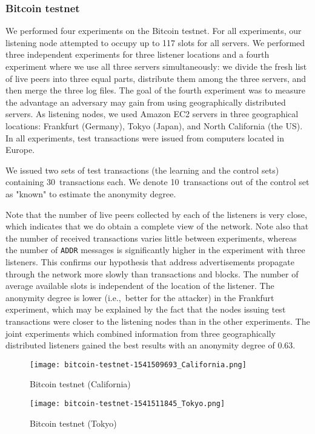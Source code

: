 \subsubsection{Bitcoin testnet}

We performed four experiments on the Bitcoin testnet.
For all experiments, our listening node attempted to occupy up to 117 slots for all servers.
We performed three independent experiments for three listener locations and a fourth experiment where we use all three servers simultaneously: we divide the fresh list of live peers into three equal parts, distribute them among the three servers, and then merge the three log files.
The goal of the fourth experiment was to measure the advantage an adversary may gain from using geographically distributed servers.
As listening nodes, we used Amazon EC2 servers in three geographical locations: Frankfurt (Germany), Tokyo (Japan), and North California (the US).
In all experiments, test transactions were issued from computers located in Europe.

We issued two sets of test transactions (the learning and the control sets) containing 30~transactions each.
We denote 10~transactions out of the control set as "known" to estimate the anonymity degree.

Note that the number of live peers collected by each of the listeners is very close, which indicates that we do obtain a complete view of the network.
Note also that the number of received transactions varies little between experiments, whereas the number of \texttt{ADDR} messages is significantly higher in the experiment with three listeners.
This confirms our hypothesis that address advertisements propagate through the network more slowly than transactions and blocks.
The number of average available slots is independent of the location of the listener.
The anonymity degree is lower (i.e.,~better for the attacker) in the Frankfurt experiment, which may be explained by the fact that the nodes issuing test transactions were closer to the listening nodes than in the other experiments.
The joint experiments which combined information from three geographically distributed listeners gained the best results with an anonymity degree of 0.63.

\begin{figure*}
	\centering
	\begin{minipage}{0.5\textwidth}
		\centering
		\texttt{[image: bitcoin-testnet-1541509693\_California.png]}
		\caption{Bitcoin testnet (California)}
	\end{minipage}\hfill
	\begin{minipage}{0.5\textwidth}
		\centering
		\texttt{[image: bitcoin-testnet-1541511845\_Tokyo.png]}
		\caption{Bitcoin testnet (Tokyo)}
	\end{minipage}\hfill
	\label{fig:bitcoin-testnet-1}
\end{figure*}


